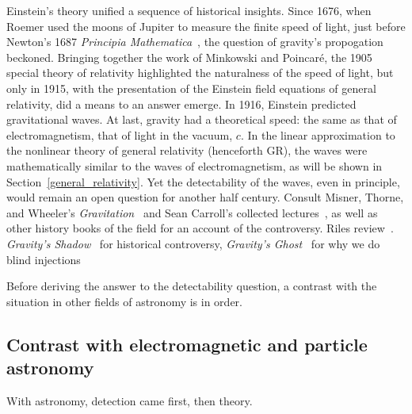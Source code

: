         Einstein's theory unified a sequence of historical insights. Since 1676, when Roemer used the moons of Jupiter to measure the finite speed of light, just before Newton's 1687 \textit{Principia Mathematica}~\cite{Hawking2002}, the question of gravity's propogation beckoned. 
Bringing together the work of Minkowski and Poincar\'{e}, the 1905 special theory of relativity highlighted the naturalness of the speed of light, but only in 1915, with the presentation of the Einstein field equations of general relativity, did a means to an answer emerge. 
In 1916, Einstein predicted gravitational waves. 
At last, gravity had a theoretical speed: the same as that of electromagnetism, that of light in the vacuum, $c$.
In the linear approximation to the nonlinear theory of general relativity (henceforth GR), the waves were mathematically similar to the waves of electromagnetism, as will be shown in Section~\ref{general_relativity}.
Yet the detectability of the waves, even in principle, would remain an open question for another half century. 
Consult Misner, Thorne, and Wheeler's \textit{Gravitation}~\cite{MisnerThorneWheeler} and Sean Carroll's collected lectures~\cite{Carroll1997}, as well as other history books of the field for an account of the controversy.
Riles review~\cite{Riles2013}.
\textit{Gravity's Shadow}~\cite{CollinsGravityShadow} for historical controversy,
\textit{Gravity's Ghost}~\cite{CollinsGravityGhost} for why we do blind injections

Before deriving the answer to the detectability question, a contrast with the situation in other fields of astronomy is in order.

 
        \subsection{Contrast with electromagnetic and particle astronomy}
        \label{contrast_astro}

        With astronomy, detection came first, then theory.

